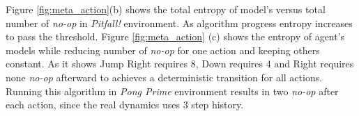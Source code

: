 Figure \ref{fig:meta_action}(b) shows the total entropy of model's versus total number of \textit{no-op} in \textit{Pitfall!} environment. As algorithm progress entropy increases to pass the threshold. Figure \ref{fig:meta_action} (c) shows the entropy of agent's models while reducing number of \textit{no-op} for one action and keeping others constant. As it shows Jump Right requires 8, Down requires 4 and Right requires none \textit{no-op} afterward to achieves a deterministic transition for all actions. Running this algorithm in \textit{Pong Prime} environment results in two \textit{no-op} after each action, since the real dynamics uses 3 step history.
